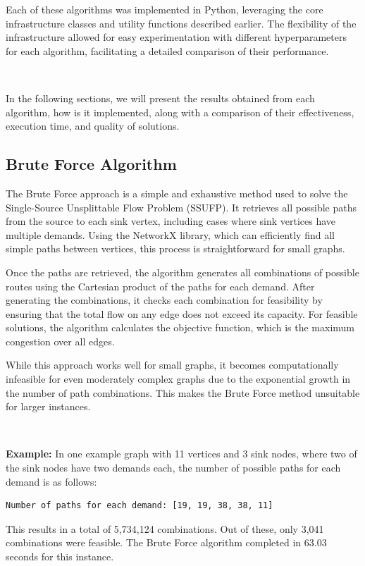 \documentclass[a4paper,12pt]{article}
\begin{document}
\noindent Each of these algorithms was implemented in Python, leveraging the core infrastructure classes and utility functions described earlier. The flexibility of the infrastructure allowed for easy experimentation with different hyperparameters for each algorithm, facilitating a detailed comparison of their performance.

\

\noindent  In the following sections, we will present the results obtained from each algorithm, how is it implemented, along with a comparison of their effectiveness, execution time, and quality of solutions.

\subsection{Brute Force Algorithm}

The Brute Force approach is a simple and exhaustive method used to solve the Single-Source Unsplittable Flow Problem (SSUFP). It retrieves all possible paths from the source to each sink vertex, including cases where sink vertices have multiple demands. Using the NetworkX library, which can efficiently find all simple paths between vertices, this process is straightforward for small graphs.

\noindent Once the paths are retrieved, the algorithm generates all combinations of possible routes using the Cartesian product of the paths for each demand. After generating the combinations, it checks each combination for feasibility by ensuring that the total flow on any edge does not exceed its capacity. For feasible solutions, the algorithm calculates the objective function, which is the maximum congestion over all edges.

\noindent While this approach works well for small graphs, it becomes computationally infeasible for even moderately complex graphs due to the exponential growth in the number of path combinations. This makes the Brute Force method unsuitable for larger instances.

\

\noindent \textbf{Example:}
In one example graph with 11 vertices and 3 sink nodes, where two of the sink nodes have two demands each, the number of possible paths for each demand is as follows:

\begin{verbatim}
Number of paths for each demand: [19, 19, 38, 38, 11]
\end{verbatim}

\noindent This results in a total of 5,734,124 combinations. Out of these, only 3,041 combinations were feasible. The Brute Force algorithm completed in 63.03 seconds for this instance.
\end{document}
